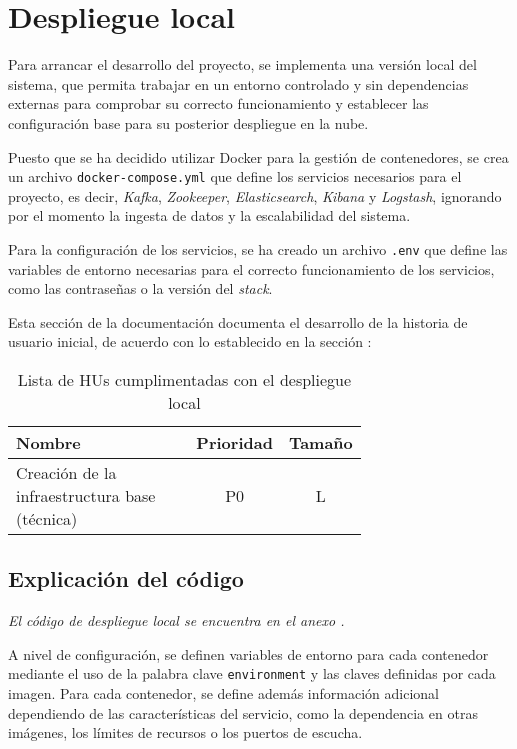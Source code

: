 \section{Despliegue local}\label{sec:impl_local}
Para arrancar el desarrollo del proyecto, se implementa una versión local del
sistema, que permita trabajar en un entorno controlado y sin dependencias
externas para comprobar su correcto funcionamiento y establecer
las configuración base para su posterior despliegue en la nube.

Puesto que se ha decidido utilizar Docker para la gestión de contenedores, se
crea un archivo \texttt{docker-compose.yml} que define los servicios
necesarios para el proyecto, es decir, \textit{Kafka}, \textit{Zookeeper},
\textit{Elasticsearch}, \textit{Kibana} y \textit{Logstash}, ignorando por
el momento la ingesta de datos y la escalabilidad del sistema.

Para la configuración de los servicios, se ha creado un archivo \texttt{.env}
que define las variables de entorno necesarias para el correcto funcionamiento
de los servicios, como las contraseñas o la versión del \textit{stack}.

Esta sección de la documentación documenta el desarrollo de la historia de
usuario inicial, de acuerdo con lo establecido en la sección :

\begin{table}[H]
	\centering
	\begin{tabular}{|p{0.7\linewidth}|c|c|}
		\hline
		\textbf{Nombre} & \textbf{Prioridad} & \textbf{Tamaño} \\
		\hline
		\hline
		Creación de la infraestructura base (técnica) & P0\cellcolor{red!50} & L\cellcolor{orange!50} \\
		\hline
  	\end{tabular}
  	\caption{Lista de HUs cumplimentadas con el despliegue local}
  	\label{tab:impl_local}
\end{table}


\newpage{}
\subsection{Explicación del código}
\emph{El código de despliegue local se encuentra en el anexo .}

A nivel de configuración, se definen variables de entorno para cada contenedor
mediante el uso de la palabra clave \texttt{environment} y las claves definidas
por cada imagen. Para cada contenedor, se define además información adicional
dependiendo de las características del servicio, como la dependencia en otras
imágenes, los límites de recursos o los puertos de escucha.

